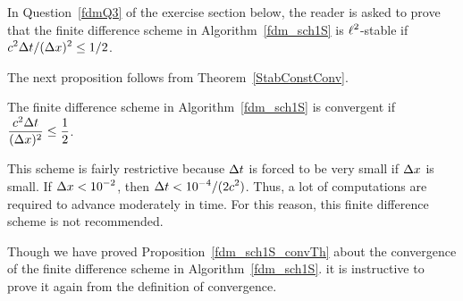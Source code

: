 In Question~\ref{fdmQ3} of the exercise section below, the reader is
asked to prove that the finite difference scheme in
Algorithm~\ref{fdm_sch1S} is $\displaystyle \ell^2$-stable if
$\displaystyle c^2\Delta{t}/(\Delta{x})^2 \leq 1/2$.

The next proposition follows from Theorem~\ref{StabConstConv}.

\begin{prop}\label{fdm_sch1S_convTh}
The finite difference scheme in Algorithm~\ref{fdm_sch1S} is
convergent if
$\displaystyle \frac{c^2\Delta{t}}{(\Delta{x})^2} \leq \frac{1}{2}$.
\end{prop}

This scheme is fairly restrictive because $\Delta{t}$ is forced
to be very small if $\Delta{x}$ is small.  If
$\displaystyle \Delta{x} < 10^{-2}$, then
$\displaystyle \Delta{t} <  10^{-4}/(2c^2)$.  Thus, a lot of computations
are required to advance moderately in time.  For this reason, this
finite difference scheme is not recommended.

Though we have proved Proposition~\ref{fdm_sch1S_convTh} about
the convergence of the finite difference scheme in
Algorithm~\ref{fdm_sch1S}. it is instructive to prove it again from the
definition of convergence.

